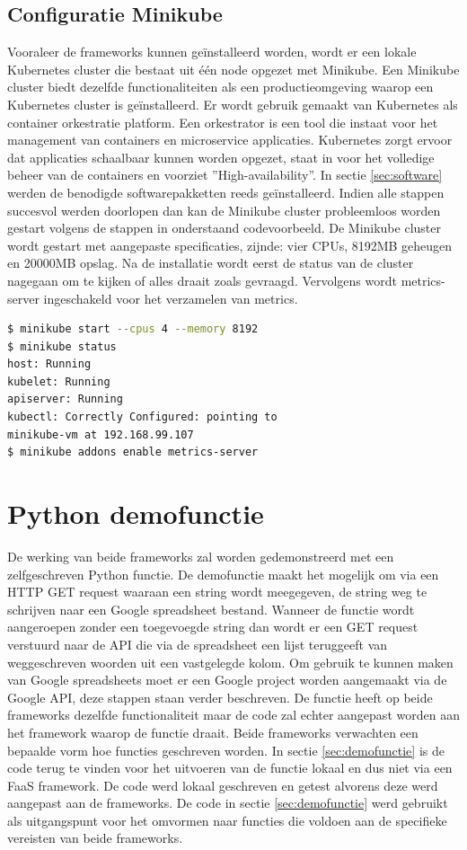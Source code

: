 \subsection{Configuratie Minikube}
\label{sec:configuratie-minikube}
Vooraleer de frameworks kunnen geïnstalleerd worden, wordt er een lokale Kubernetes cluster die bestaat uit één node opgezet met Minikube. Een Minikube cluster biedt dezelfde functionaliteiten als een productieomgeving waarop een Kubernetes cluster is geïnstalleerd. Er wordt gebruik gemaakt van Kubernetes als container orkestratie platform. Een orkestrator is een tool die instaat voor het management van containers en microservice applicaties. Kubernetes zorgt ervoor dat applicaties schaalbaar kunnen worden opgezet, staat in voor het volledige beheer van de containers en voorziet ''High-availability''.
In sectie \ref{sec:software} werden de benodigde softwarepakketten reeds geïnstalleerd. Indien alle stappen succesvol werden doorlopen dan kan de Minikube cluster probleemloos worden gestart volgens de stappen in onderstaand codevoorbeeld. De Minikube cluster wordt gestart met aangepaste specificaties, zijnde: vier CPUs, 8192MB geheugen en 20000MB opslag. Na de installatie wordt eerst de status van de cluster nagegaan om te kijken of alles draait zoals gevraagd. Vervolgens wordt metrics-server ingeschakeld voor het verzamelen van metrics.

\begin{lstlisting}[language=bash]
$ minikube start --cpus 4 --memory 8192
$ minikube status
host: Running
kubelet: Running
apiserver: Running
kubectl: Correctly Configured: pointing to
minikube-vm at 192.168.99.107
$ minikube addons enable metrics-server
\end{lstlisting}

\newpage
\section{Python demofunctie}
\label{sec:python-demofunctie}
De werking van beide frameworks zal worden gedemonstreerd met een zelfgeschreven Python functie. De demofunctie maakt het mogelijk om via een HTTP GET request waaraan een string wordt meegegeven, de string weg te schrijven naar een Google spreadsheet bestand. Wanneer de functie wordt aangeroepen zonder een toegevoegde string dan wordt er een GET request verstuurd naar de API die via de spreadsheet een lijst teruggeeft van weggeschreven woorden uit een vastgelegde kolom. Om gebruik te kunnen maken van Google spreadsheets moet er een Google project worden aangemaakt via de Google API, deze stappen staan verder beschreven. De functie heeft op beide frameworks dezelfde functionaliteit maar de code zal echter aangepast worden aan het framework waarop de functie draait. Beide frameworks verwachten een bepaalde vorm hoe functies geschreven worden. In sectie \ref{sec:demofunctie} is de code terug te vinden voor het uitvoeren van de functie lokaal en dus niet via een FaaS framework. De code werd lokaal geschreven en getest alvorens deze werd aangepast aan de frameworks. De code in sectie \ref{sec:demofunctie} werd gebruikt als uitgangspunt voor het omvormen naar functies die voldoen aan de specifieke vereisten van beide frameworks.

